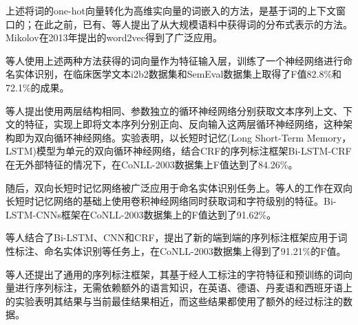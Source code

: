 上述将词的one-hot向量转化为高维实向量的词嵌入的方法，是基于词的上下文窗口的；在此之前，已有\citet{bengio2003neural}、\citet{mikolov2010recurrent}等人提出了从大规模语料中获得词的分布式表示的方法。Mikolov\citep{mikolov2013distributed, mikolov2013efficient}在2013年提出的word2vec得到了广泛应用。

\citet{wu2015study}等人使用上述两种方法获得的词向量作为特征输入层，训练了一个神经网络进行命名实体识别，在临床医学文本i2b2数据集和SemEval数据集上取得了F值82.8\%和72.1\%的成果。

\citet{huang2015bidirectional}等人提出使用两层结构相同、参数独立的循环神经网络分别获取文本序列上文、下文的特征，实现上即将文本序列分别正向、反向输入这两层循环神经网络，这种架构即为双向循环神经网络。实验表明，以长短时记忆(Long Short-Term Memory， LSTM)模型为单元的双向循环神经网络，结合CRF的序列标注框架Bi-LSTM-CRF在无外部特征的情况下，在CoNLL-2003数据集上F值达到了84.26\%。

随后，双向长短时记忆网络被广泛应用于命名实体识别任务上。\citet{chiu2015named,}等人的工作在双向长短时记忆网络的基础上使用卷积神经网络同时获取词和字符级别的特征。Bi-LSTM-CNNs框架在CoNLL-2003数据集上的F值达到了91.62\%。

等人结合了Bi-LSTM、CNN和CRF，提出了新的端到端的序列标注框架应用于词性标注、命名实体识别等任务上，在CoNLL-2003数据集上得到了91.21\%的F值。

\cite{lample2016neural}等人还提出了通用的序列标注框架，其基于经人工标注的字符特征和预训练的词向量进行序列标注，无需依赖额外的语言知识，在英语、德语、丹麦语和西班牙语上的实验表明其结果与当前最佳结果相近，而这些结果都使用了额外的经过标注的数据。

